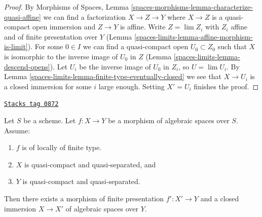 \begin{proof}
By Morphisms of Spaces, Lemma
\ref{spaces-morphisms-lemma-characterize-quasi-affine}
we can find a factorization $X \to Z \to Y$ where
$X \to Z$ is a quasi-compact open immersion and
$Z \to Y$ is affine. Write $Z = \lim Z_i$ with $Z_i$ affine and
of finite presentation over $Y$ (Lemma \ref{spaces-limits-lemma-affine-morphism-is-limit}).
For some $0 \in I$ we can find a quasi-compact open $U_0 \subset Z_0$
such that $X$ is isomorphic to the inverse image of $U_0$ in $Z$
(Lemma \ref{spaces-limits-lemma-descend-opens}). Let $U_i$ be the inverse image of
$U_0$ in $Z_i$, so $U = \lim U_i$. By
Lemma \ref{spaces-limits-lemma-finite-type-eventually-closed}
we see that $X \to U_i$ is a closed immersion for some $i$ large enough.
Setting $X' = U_i$ finishes the proof.
\end{proof}

\begin{lemma}
\label{spaces-limits-lemma-finite-type-closed-in-finite-presentation}
\href{https://stacks.math.columbia.edu/tag/0872}{\texttt{Stacks tag 0872}}

Let $S$ be a scheme. Let $f : X \to Y$ be a morphism of algebraic spaces
over $S$. Assume:
\begin{enumerate}
\item $f$ is of locally of finite type.
\item $X$ is quasi-compact and quasi-separated, and
\item $Y$ is quasi-compact and quasi-separated.
\end{enumerate}
Then there exists a morphism of finite presentation
$f' : X' \to Y$ and a closed immersion $X \to X'$ of
algebraic spaces over $Y$.
\end{lemma}

